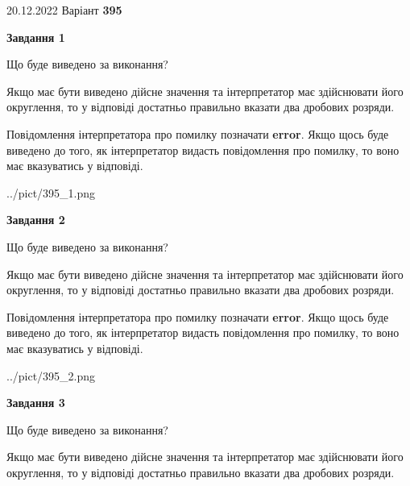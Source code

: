 \documentclass[12pt, ukrainian]{article}
\begin{document}
{20.12.2022 Варіант \No \textbf { 395 }\par}
{
\begin {Large}

{\begin {center}\textbf{Завдання 1}\end {center}}\par
Що буде виведено за виконання? \par

Якщо має бути виведено дійсне значення та інтерпретатор має здійснювати його округлення, 
то у відповіді достатньо правильно вказати два дробових розряди.

Повідомлення інтерпретатора про помилку позначати \textbf{error}.
Якщо щось буде виведено до того, як інтерпретатор видасть повідомлення про помилку, 
то воно має вказуватись у відповіді. \par

\begin{center}
	{../pict/395_1.png}
\end{center}
\newpage

{\begin {center}\textbf{Завдання 2}\end {center}}\par
Що буде виведено за виконання? \par

Якщо має бути виведено дійсне значення та інтерпретатор має здійснювати його округлення, 
то у відповіді достатньо правильно вказати два дробових розряди.

Повідомлення інтерпретатора про помилку позначати \textbf{error}.
Якщо щось буде виведено до того, як інтерпретатор видасть повідомлення про помилку, 
то воно має вказуватись у відповіді. \par

\begin{center}
	{../pict/395_2.png}
\end{center}
\newpage

{\begin {center}\textbf{Завдання 3}\end {center}}\par
Що буде виведено за виконання? \par

Якщо має бути виведено дійсне значення та інтерпретатор має здійснювати його округлення, 
то у відповіді достатньо правильно вказати два дробових розряди.


\end{Large}}
\end{document}
